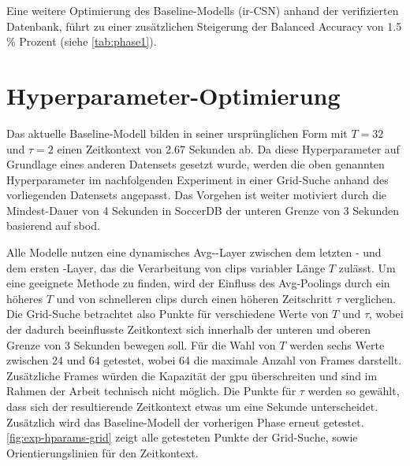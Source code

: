 Eine weitere Optimierung des Baseline-Modells (ir-CSN) anhand der verifizierten Datenbank, führt zu einer zusätzlichen Steigerung der Balanced Accuracy von 1.5 \% Prozent (siehe \autoref{tab:phase1}).

\section{Hyperparameter-Optimierung}
\label{sec:hyperparameter-optimierung}

Das aktuelle Baseline-Modell bilden in seiner ursprünglichen Form mit $T=32$ und $\tau = 2$ einen Zeitkontext von 2.67 Sekunden ab.
Da diese Hyperparameter auf Grundlage eines anderen Datensets gesetzt wurde, werden die oben genannten Hyperparameter im nachfolgenden Experiment in einer Grid-Suche anhand des vorliegenden Datensets angepasst.
Das Vorgehen ist weiter motiviert durch die Mindest-Dauer von 4 Sekunden in SoccerDB \bzw der unteren Grenze von 3 Sekunden basierend auf \gls{sbod}.

Alle Modelle nutzen eine dynamisches Avg-\pool-Layer zwischen dem letzten \conv- und dem ersten \fc-Layer, das die Verarbeitung von \glspl{clip} variabler Länge $T$ zulässt.
Um eine geeignete Methode zu finden, wird der Einfluss des Avg-Poolings durch ein höheres $T$ und von schnelleren \glspl{clip} durch einen höheren Zeitschritt $\tau$ verglichen.
Die Grid-Suche betrachtet also Punkte für verschiedene Werte von $T$ und $\tau$, wobei der dadurch beeinflusste Zeitkontext sich innerhalb der unteren und oberen Grenze von 3  Sekunden bewegen soll.
Für die Wahl von $T$ werden sechs Werte zwischen 24 und 64 getestet, wobei 64 die maximale Anzahl von Frames darstellt.
Zusätzliche Frames würden die Kapazität der \gls{gpu} überschreiten und sind im Rahmen der Arbeit technisch nicht möglich.
Die Punkte für $\tau$ werden so gewählt, dass sich der resultierende Zeitkontext etwas um eine Sekunde unterscheidet.
Zusätzlich wird das Baseline-Modell der vorherigen Phase erneut getestet.
\autoref{fig:exp-hparams-grid} zeigt alle getesteten Punkte der Grid-Suche, sowie Orientierungslinien für den Zeitkontext.


